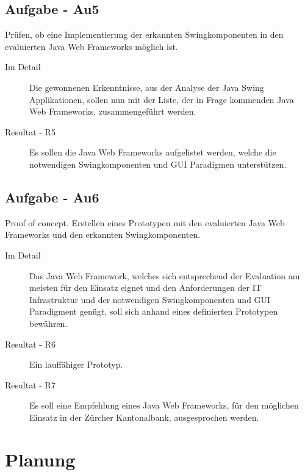   \subsection{Aufgabe - Au5\label{itm:Aufgabe-05}}

  \begin{itshape}Prüfen, ob eine Implementierung der erkannten
    Swingkomponenten in den evaluierten Java Web Frameworks möglich
    ist.\end{itshape}
    
  \begin{description}
    \item[Im Detail\label{itm:Detail-05}]
    Die gewonnenen Erkenntnisse, aus der Analyse der Java Swing Applikationen,
    sollen nun mit der Liste, der in Frage kommenden Java Web Frameworks,
    zusammengeführt werden.
    \item[Resultat - R5\label{itm:Resultat-05}]
    Es sollen die Java Web Frameworks aufgelistet werden, welche die
    notwendigen Swingkomponenten und GUI Paradigmen unterstützen.
  \end{description}

  \subsection{Aufgabe - Au6\label{itm:Aufgabe-06}}

  \begin{itshape}Proof of concept. Erstellen eines Prototypen mit den
    evaluierten Java Web Frameworks und den erkannten
    Swingkomponenten.\end{itshape}
  
  \begin{description}
    \item[Im Detail\label{itm:Detail-06}]
    Das Java Web Framework, welches sich entsprechend der Evaluation am meisten
    für den Einsatz eignet und den Anforderungen der IT Infrastruktur und der
    notwendigen Swingkomponenten und GUI Paradigment genügt, soll sich anhand
    eines definierten Prototypen bewähren.
    \item[Resultat - R6\label{itm:Resultat-06}]
    Ein lauffähiger Prototyp.
    \item[Resultat - R7\label{itm:Resultat-07}]
    Es soll eine Empfehlung eines Java Web Frameworks, für den möglichen Einsatz
    in der Zürcher Kantonalbank, ausgesprochen werden.
  \end{description}
  
  \section{Planung}
  

